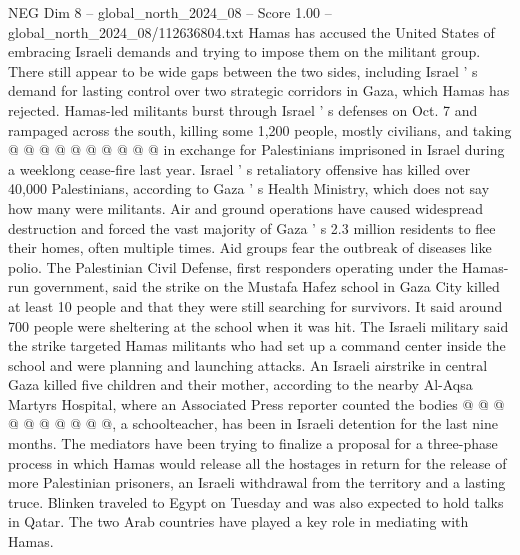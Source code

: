 \begin{textsample}{NEG Dim 8 – global\_north\_2024\_08 – Score 1.00 – global\_north\_2024\_08/112636804.txt}
Hamas has accused the United States of embracing Israeli demands and trying to impose them on the militant group.
There still appear to be wide gaps between the two sides, including Israel ' s demand for lasting control over two strategic corridors in Gaza, which Hamas has rejected.
Hamas-led militants burst through Israel ' s defenses on Oct. 7 and rampaged across the south, killing some 1,200 people, mostly civilians, and taking @ @ @ @ @ @ @ @ @ @ in exchange for Palestinians imprisoned in Israel during a weeklong cease-fire last year.
Israel ' s retaliatory offensive has killed over 40,000 Palestinians, according to Gaza ' s Health Ministry, which does not say how many were militants.
Air and ground operations have caused widespread destruction and forced the vast majority of Gaza ' s 2.3 million residents to flee their homes, often multiple times.
Aid groups fear the outbreak of diseases like polio.
The Palestinian Civil Defense, first responders operating under the Hamas-run government, said the strike on the Mustafa Hafez school in Gaza City killed at least 10 people and that they were still searching for survivors.
It said around 700 people were sheltering at the school when it was hit.
The Israeli military said the strike targeted Hamas militants who had set up a command center inside the school and were planning and launching attacks.
An Israeli airstrike in central Gaza killed five children and their mother, according to the nearby Al-Aqsa Martyrs Hospital, where an Associated Press reporter counted the bodies @ @ @ @ @ @ @ @ @ @, a schoolteacher, has been in Israeli detention for the last nine months.
The mediators have been trying to finalize a proposal for a three-phase process in which Hamas would release all the hostages in return for the release of more Palestinian prisoners, an Israeli withdrawal from the territory and a lasting truce.
Blinken traveled to Egypt on Tuesday and was also expected to hold talks in Qatar.
The two Arab countries have played a key role in mediating with Hamas.

\end{textsample}
